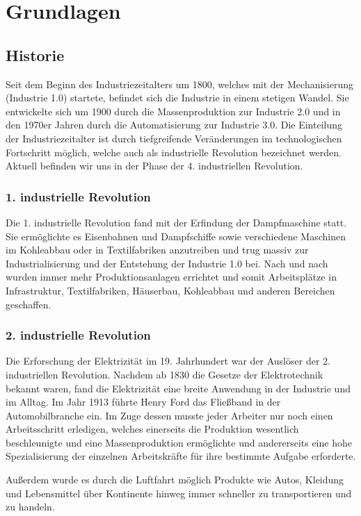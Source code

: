\chapter{Grundlagen}
\section{Historie}
Seit dem Beginn des Industriezeitalters um 1800, welches mit der Mechanisierung (Industrie 1.0) startete, befindet sich die Industrie in einem stetigen Wandel. Sie entwickelte sich um 1900 durch die Massenproduktion zur Industrie 2.0 und in den 1970er Jahren durch die Automatisierung zur Industrie 3.0. Die Einteilung der Industriezeitalter ist durch tiefgreifende Veränderungen im technologischen Fortschritt möglich, welche auch als industrielle Revolution bezeichnet werden. Aktuell befinden wir uns in der Phase der 4. industriellen Revolution.

\subsection{1. industrielle Revolution}
Die 1. industrielle Revolution fand mit der Erfindung der Dampfmaschine statt. Sie ermöglichte es Eisenbahnen und Dampfschiffe sowie verschiedene Maschinen im Kohleabbau oder in Textilfabriken anzutreiben und trug massiv zur Industrialisierung und der Entstehung der Industrie 1.0 bei. Nach und nach wurden immer mehr Produktionsanlagen errichtet und somit Arbeitsplätze in Infrastruktur, Textilfabriken, Häuserbau, Kohleabbau und anderen Bereichen geschaffen.

\subsection{2. industrielle Revolution}
Die Erforschung der Elektrizität im 19. Jahrhundert war der Auslöser der 2. industriellen Revolution. Nachdem ab 1830 die Gesetze der Elektrotechnik bekannt waren, fand die Elektrizität eine breite Anwendung in der Industrie und im Alltag. Im Jahr 1913 führte Henry Ford das Fließband in der Automobilbranche ein. Im Zuge dessen musste jeder Arbeiter nur noch einen Arbeitsschritt erledigen, welches einerseits die Produktion wesentlich beschleunigte und eine Massenproduktion ermöglichte und andererseits eine hohe Spezialisierung der einzelnen Arbeitskräfte für ihre bestimmte Aufgabe erforderte.

Außerdem wurde es durch die Luftfahrt möglich Produkte wie Autos, Kleidung und Lebensmittel über Kontinente hinweg immer schneller zu transportieren und zu handeln.

